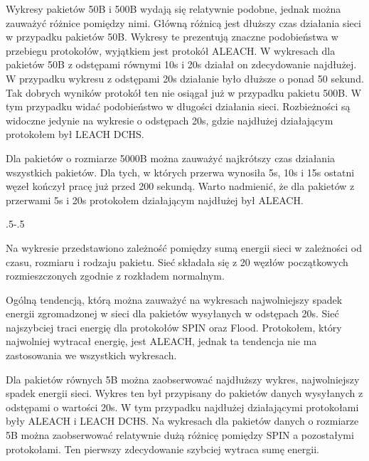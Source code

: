 Wykresy pakietów 50B i 500B wydają się relatywnie podobne, jednak można zauważyć różnice pomiędzy nimi. Główną różnicą jest dłuższy czas działania sieci w przypadku pakietów 50B. Wykresy te prezentują znaczne podobieństwa w przebiegu protokołów, wyjątkiem jest protokół ALEACH. W wykresach dla pakietów 50B z odstępami równymi 10s i 20s działał on zdecydowanie najdłużej. W przypadku wykresu z odstępami 20s działanie było dłuższe o ponad 50 sekund. Tak dobrych wyników protokół ten nie osiągał już w przypadku pakietu 500B. W tym przypadku widać podobieństwo w długości działania sieci. Rozbieżności są widoczne jedynie na wykresie o odstępach 20s, gdzie najdłużej działającym protokołem był LEACH DCHS. 

Dla pakietów o rozmiarze 5000B można zauważyć najkrótszy czas działania wszystkich pakietów. Dla tych, w których przerwa wynosiła 5s, 10s i 15s ostatni węzeł kończył pracę już przed 200 sekundą. Warto nadmienić, że dla pakietów z przerwami 5s i 20s protokołem działającym najdłużej był ALEACH. 
 

\clearpage
\thispagestyle{empty}

{\pdfpagewidth
    \vspace*{-2cm}
    \noindent\kern.5\pdfpagewidth{}\kern-.5\pdfpagewidth
     \par
     \vspace*{-5cm}
\clearpage
}

Na wykresie przedstawiono zależność pomiędzy sumą energii sieci w zależności od czasu, rozmiaru  i rodzaju pakietu.  Sieć składała się z 20 węzłów początkowych rozmieszczonych zgodnie z rozkładem normalnym.
  
Ogólną tendencją, którą można zauważyć na wykresach najwolniejszy spadek energii zgromadzonej w sieci dla pakietów wysyłanych w odstępach 20s. Sieć najszybciej traci energię dla protokołów SPIN oraz Flood. Protokołem, który najwolniej wytracał energię, jest ALEACH, jednak ta tendencja nie ma zastosowania we wszystkich wykresach.

Dla pakietów równych 5B można zaobserwować najdłuższy wykres, najwolniejszy spadek energii sieci. Wykres ten był przypisany do pakietów danych wysyłanych z odstępami o wartości 20s. W tym przypadku najdłużej działającymi protokołami były ALEACH i LEACH DCHS. Na wykresach dla pakietów danych o rozmiarze 5B można zaobserwować relatywnie dużą różnicę pomiędzy SPIN a pozostałymi protokołami. Ten pierwszy zdecydowanie szybciej wytraca sumę energii. 

